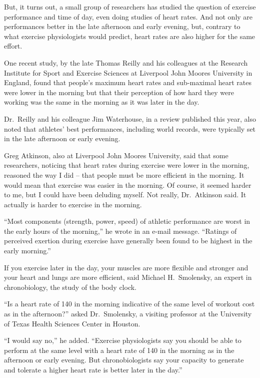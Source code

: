 ﻿\documentclass[12pt]{article}
\begin{document}
But, it turns out, a small group of researchers has studied the question of exercise performance and
time of day, even doing studies of heart rates. And not only are performances better in the late
afternoon and early evening, but, contrary to what exercise physiologists would predict, heart rates
are also higher for the same effort.

One recent study, by the late Thomas Reilly and his colleagues at the Research Institute for Sport
and Exercise Sciences at Liverpool John Moores University in England, found that people's maximum
heart rates and sub-maximal heart rates were lower in the morning but that their perception of how
hard they were working was the same in the morning as it was later in the day.

Dr.~Reilly and his colleague Jim Waterhouse, in a review published this year, also noted that
athletes' best performances, including world records, were typically set in the late afternoon or
early evening.

Greg Atkinson, also at Liverpool John Moores University, said that some researchers, noticing that
heart rates during exercise were lower in the morning, reasoned the way I did -- that people must be
more efficient in the morning. It would mean that exercise was easier in the morning. Of course, it
seemed harder to me, but I could have been deluding myself. Not really, Dr.~Atkinson said. It
actually is harder to exercise in the morning.

``Most components (strength, power, speed) of athletic performance are worst in the early hours of
the morning,'' he wrote in an e-mail message. ``Ratings of perceived exertion during exercise have
generally been found to be highest in the early morning.''

If you exercise later in the day, your muscles are more flexible and stronger and your heart and
lungs are more efficient, said Michael H.~Smolensky, an expert in chronobiology, the study of the
body clock.

``Is a heart rate of 140 in the morning indicative of the same level of workout cost as in the
afternoon?'' asked Dr.~Smolensky, a visiting professor at the University of Texas Health Sciences
Center in Houston.

``I would say no,'' he added. ``Exercise physiologists say you should be able to perform at the same
level with a heart rate of 140 in the morning as in the afternoon or early evening. But
chronobiologists say your capacity to generate and tolerate a higher heart rate is better later in
the day.''
\end{document}
